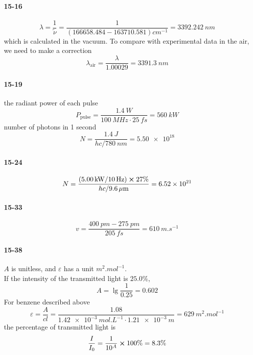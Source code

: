 \documentclass[a4paper]{article}
\newcommand{\ex}[1]{\paragraph{15-#1}}
\numberwithin{equation}{section}
\begin{document}
\ex{16}
\begin{equation}\label{key}
\lambda = \dfrac{1}{\tilde{\nu}} = \dfrac{1}{(166658.484 - 163710.581)\si{cm^{-1}}} = \SI{3392.242}{nm}
\end{equation}
which is calculated in the vacuum. To compare with experimental data in the air, we need to make a correction
\begin{equation}\label{key}
\lambda_{\text{air}} = \dfrac{\lambda}{1.00029} = \SI{3391.3}{nm}
\end{equation}

\ex{19}
the radiant power of each pulse
\begin{equation}\label{key}
P_{\text{pulse}} = \dfrac{\SI{1.4}{W}}{\SI{100}{MHz}\cdot\SI{25}{fs}} = \SI{560}{kW}
\end{equation}
number of photons in 1 second
\begin{equation}\label{key}
N = \dfrac{\SI{1.4}{J}}{hc/\SI{780}{nm}} = \num{5.50e18}
\end{equation}

\ex{24}
\begin{equation}\label{key}
N = \dfrac{(\SI{5.00}{kW}/\SI{10}{Hz})\cross 27\%}{hc/\SI{9.6}{\mu m}} = \num{6.52e21}
\end{equation}

\ex{33}
\begin{equation}\label{key}
v = \dfrac{\SI{400}{pm} - \SI{275}{pm}}{\SI{205}{fs}} = \SI{610}{m.s^{-1}}
\end{equation}

\ex{38}
$ A $ is unitless, and $ \varepsilon $ has a unit $ \si{m^2.mol^{-1}} $.\\
If the intensity of the transmitted light is $ 25.0\% $,
\begin{equation}\label{key}
A = \lg \dfrac{1}{0.25} = 0.602
\end{equation}
For benzene described above
\begin{equation}\label{key}
\varepsilon = \dfrac{A}{cl} = \dfrac{1.08}{\SI{1.42e-3}{mol.L^{-1}}\cdot\SI{1.21e-3}{m}} = \SI{629}{m^2.mol^{-1}}
\end{equation}
the percentage of transmitted light is
\begin{equation}\label{key}
\dfrac{I}{I_0} = \dfrac{1}{10^A}\cross 100\% = 8.3\%
\end{equation}
\end{document}
